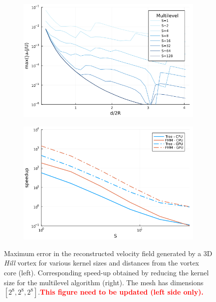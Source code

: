 \documentclass[final,1p,times]{elsarticle}
\begin{document}
\begin{figure}
    \centering
    \begin{subfigure}{.5\textwidth}
        \centering
        \includegraphics[width=\textwidth]{tex//fig/Hill_error_dists.png}
    \end{subfigure}%
    \begin{subfigure}{.5\textwidth}
        \centering
        \includegraphics[width=\textwidth]{tex/fig/Hill_speedup_dists.png}
    \end{subfigure}
    \caption{Maximum error in the reconstructed velocity field generated by a 3D \emph{Hill} vortex for various kernel sizes and distances from the vortex core (left). Corresponding speed-up obtained by reducing the kernel size for the multilevel algorithm (right). The mesh has dimensions $[2^8,2^8,2^8]$.\textcolor{red}{\textbf{This figure need to be updated (left side only).}}}
    \label{fig:error_hill_3}
\end{figure}
\end{document}
